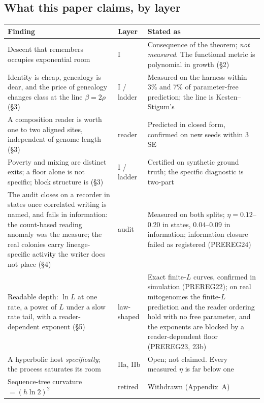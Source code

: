 \documentclass[11pt]{article}
\begin{document}
\subsection{What this paper claims, by layer}

\begin{center}\small
\begin{tabular}{@{}>{\raggedright\arraybackslash}p{5.6cm}>{\raggedright\arraybackslash}p{1.8cm}>{\raggedright\arraybackslash}p{5.6cm}@{}}
\toprule
\textbf{Finding} & \textbf{Layer} & \textbf{Stated as} \\
\midrule
Descent that remembers occupies exponential room & I & Consequence of the theorem; \emph{not measured}. The functional metric is polynomial in growth (\S2) \\
Identity is cheap, genealogy is dear, and the price of genealogy changes class at the line $\beta=2\rho$ (\S3) & I / ladder & Measured on the harness within 3\% and 7\% of parameter-free prediction; the line is Kesten--Stigum's \\
A composition reader is worth one to two aligned sites, independent of genome length (\S3) & reader & Predicted in closed form, confirmed on new seeds within 3 SE \\
Poverty and mixing are distinct exits; a floor alone is not specific; block structure is (\S3) & I / ladder & Certified on synthetic ground truth; the specific diagnostic is two-part \\
The audit closes on a recorder in states once correlated writing is named, and fails in information: the count-based reading anomaly was the measure; the real colonies carry lineage-specific activity the writer does not place (\S4) & audit & Measured on both splits; $\eta=0.12$--$0.20$ in states, $0.04$--$0.09$ in information; information closure failed as registered (PREREG24) \\
Readable depth: $\ln L$ at one rate, a power of $L$ under a slow rate tail, with a reader-dependent exponent (\S5) & law-shaped & Exact finite-$L$ curves, confirmed in simulation (PREREG22); on real mitogenomes the finite-$L$ prediction and the reader ordering hold with no free parameter, and the exponents are blocked by a reader-dependent floor (PREREG23, 23b) \\
A hyperbolic host \emph{specifically}; the process saturates its room & IIa, IIb & Open; not claimed. Every measured $\eta$ is far below one \\
Sequence-tree curvature $=(h\ln2)^2$ & retired & Withdrawn (Appendix~A) \\
\bottomrule
\end{tabular}
\end{center}
\end{document}
